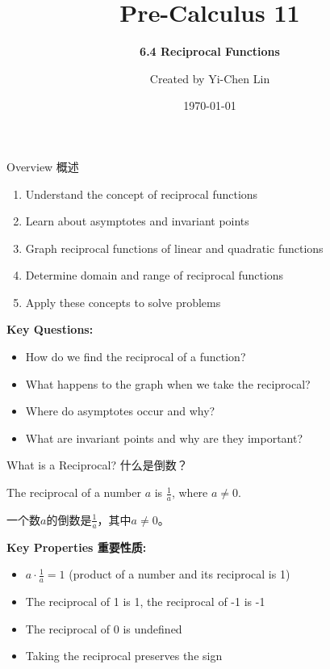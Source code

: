 \documentclass[aspectratio=169]{beamer}
\title{Pre-Calculus 11}
\subtitle{\textbf{6.4 Reciprocal Functions}}
\author{Created by Yi-Chen Lin}
\date{\today}
\begin{document}
\begin{frame}
    \titlepage
    \vfill
\end{frame}

\begin{frame}{Overview 概述}
    \begin{tcolorbox}[colback=lightgray,colframe=primary,title=What We Will Learn 学习目标]
        \footnotesize
        \begin{enumerate}
            \item Understand the concept of reciprocal functions
            \item Learn about asymptotes and invariant points
            \item Graph reciprocal functions of linear and quadratic functions
            \item Determine domain and range of reciprocal functions
            \item Apply these concepts to solve problems
        \end{enumerate}
    \end{tcolorbox}
    \vspace{1em}
    \textbf{Key Questions:}
    \begin{itemize}
        \item How do we find the reciprocal of a function?
        \item What happens to the graph when we take the reciprocal?
        \item Where do asymptotes occur and why?
        \item What are invariant points and why are they important?
    \end{itemize}
\end{frame}

\begin{frame}{What is a Reciprocal? 什么是倒数？}
    \begin{tcolorbox}[colback=lightgray,colframe=primary,title=Definition 定义]
        \footnotesize
        The reciprocal of a number $a$ is $\frac{1}{a}$, where $a \neq 0$.
        \par
        一个数$a$的倒数是$\frac{1}{a}$，其中$a \neq 0$。
    \end{tcolorbox}
    \vspace{1em}
    \textbf{Key Properties 重要性质:}
    \begin{itemize}
        \item $a \cdot \frac{1}{a} = 1$ (product of a number and its reciprocal is 1)
        \item The reciprocal of 1 is 1, the reciprocal of -1 is -1
        \item The reciprocal of 0 is undefined
        \item Taking the reciprocal preserves the sign
    \end{itemize}
\end{frame}
\end{document}

